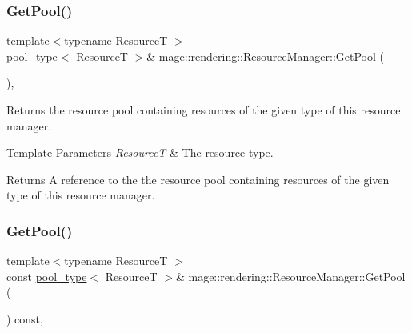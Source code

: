 \subsubsection{\texorpdfstring{Get\+Pool()}{GetPool()}\hspace{0.1cm}{\footnotesize\ttfamily [1/2]}}
{\footnotesize\ttfamily template$<$typename ResourceT $>$ \\
\mbox{\hyperlink{classmage_1_1rendering_1_1_resource_manager_ab21a4e280087032ee533f267bd9bf602}{pool\+\_\+type}}$<$ ResourceT $>$\& mage\+::rendering\+::\+Resource\+Manager\+::\+Get\+Pool (\begin{DoxyParamCaption}{ }\end{DoxyParamCaption})\hspace{0.3cm}{\ttfamily [private]}, {\ttfamily [noexcept]}}

Returns the resource pool containing resources of the given type of this resource manager.


\begin{DoxyTemplParams}{Template Parameters}
{\em ResourceT} & The resource type. \\
\hline
\end{DoxyTemplParams}
\begin{DoxyReturn}{Returns}
A reference to the the resource pool containing resources of the given type of this resource manager. 
\end{DoxyReturn}
\mbox{\label{classmage_1_1rendering_1_1_resource_manager_a5cba7eab859779a7cb74d5f2cef21173}} 
\subsubsection{\texorpdfstring{Get\+Pool()}{GetPool()}\hspace{0.1cm}{\footnotesize\ttfamily [2/2]}}
{\footnotesize\ttfamily template$<$typename ResourceT $>$ \\
const \mbox{\hyperlink{classmage_1_1rendering_1_1_resource_manager_ab21a4e280087032ee533f267bd9bf602}{pool\+\_\+type}}$<$ ResourceT $>$\& mage\+::rendering\+::\+Resource\+Manager\+::\+Get\+Pool (\begin{DoxyParamCaption}{ }\end{DoxyParamCaption}) const\hspace{0.3cm}{\ttfamily [private]}, {\ttfamily [noexcept]}}

